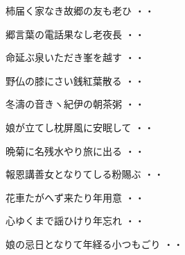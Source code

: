 \vspace{0.6cm}
\begin{shiika}柿届く家なき故郷の友も老ひ
\hfill{・・}\end{shiika}
\vspace{0.6cm}
\begin{shiika}郷言葉の電話果なし老夜長
\hfill{・・}\end{shiika}
\vspace{0.6cm}
\begin{shiika}命延ぶ泉いただき峯を越す
\hfill{・・}\end{shiika}
\vspace{0.6cm}
\begin{shiika}野仏の膝にさい銭紅葉散る
\hfill{・・}\end{shiika}
\vspace{0.6cm}
\begin{shiika}冬濤の音きヽ紀伊の朝茶粥
\hfill{・・}\end{shiika}
\vspace{0.6cm}
\begin{shiika}娘が立てし枕屏風に安眠して
\hfill{・・}\end{shiika}
\vspace{0.6cm}
\begin{shiika}晩菊に名残水やり旅に出る
\hfill{・・}\end{shiika}
\vspace{0.6cm}
\begin{shiika}報恩講善女となりてしる粉賜ぶ
\hfill{・・}\end{shiika}
\vspace{0.6cm}
\begin{shiika}花車たがへず来たり年用意
\hfill{・・}\end{shiika}
\vspace{0.6cm}
\begin{shiika}心ゆくまで謡ひけり年忘れ
\hfill{・・}\end{shiika}
\vspace{0.6cm}
\begin{shiika}娘の忌日となりて年経る小つもごり
\hfill{・・}\end{shiika}
